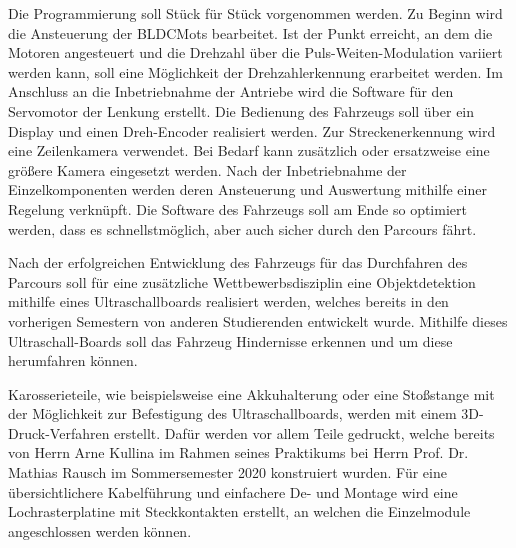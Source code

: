 Die Programmierung soll Stück für Stück vorgenommen werden. Zu Beginn wird die Ansteuerung der \acp{BLDCMot} bearbeitet. Ist der Punkt erreicht, an dem die Motoren angesteuert und die Drehzahl über die Puls-Weiten-Modulation variiert werden kann, soll eine Möglichkeit der Drehzahlerkennung erarbeitet werden. Im Anschluss an die Inbetriebnahme der Antriebe wird die Software für den Servomotor der Lenkung erstellt. Die Bedienung des Fahrzeugs soll über ein Display und einen Dreh-Encoder realisiert werden. Zur Streckenerkennung wird eine Zeilenkamera verwendet. Bei Bedarf kann zusätzlich oder ersatzweise eine größere Kamera eingesetzt werden. Nach der Inbetriebnahme der Einzelkomponenten werden deren Ansteuerung und Auswertung mithilfe einer Regelung verknüpft. Die Software des Fahrzeugs soll am Ende so optimiert werden, dass es schnellstmöglich, aber auch sicher durch den Parcours fährt.\vspace{11pt}

Nach der erfolgreichen Entwicklung des Fahrzeugs für das Durchfahren des Parcours soll für eine zusätzliche Wettbewerbsdisziplin eine Objektdetektion mithilfe eines Ultraschallboards realisiert werden, welches bereits in den vorherigen Semestern von anderen Studierenden entwickelt wurde. Mithilfe dieses Ultraschall-Boards soll das Fahrzeug Hindernisse erkennen und um diese herumfahren können.\vspace{11pt}

Karosserieteile, wie beispielsweise eine  Akkuhalterung oder eine Stoßstange mit der Möglichkeit zur Befestigung des Ultraschallboards, werden mit einem 3D-Druck-Verfahren erstellt. Dafür werden vor allem Teile gedruckt, welche bereits von Herrn Arne Kullina im Rahmen seines Praktikums bei Herrn Prof. Dr. Mathias Rausch im Sommersemester 2020 konstruiert wurden. Für eine übersichtlichere Kabelführung und einfachere De- und Montage wird eine Lochrasterplatine mit Steckkontakten erstellt, an welchen die Einzelmodule angeschlossen werden können.

\newpage